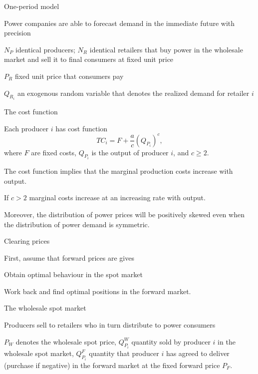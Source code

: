 



	One-period model


	Power companies are able to forecast demand in the immediate future with precision


	$N_P$ identical producers; $N_R$ identical retailers that buy power in the wholesale market and sell it to final consumers at fixed unit price


	$P_R$ fixed unit price that consumers pay


	$Q_{R_i}$ an exogenous random variable that denotes the realized demand for retailer $i$





{The cost function}






	Each producer $i$ has cost function
$$
TC_i=F+\frac{a}{c}(Q_{P_i})^c,
$$
where $F$ are fixed costs, $Q_{P_i}$ is the output of producer $i$, and $c\geq 2$.


	The cost function implies that the marginal production costs increase with output.


	If $c>2$ marginal costs increase at an increasing rate with output.


	Moreover, the distribution of power prices will be positively skewed even when the distribution of power demand is symmetric.





{Clearing prices}






	First, assume that forward prices are gives


	Obtain optimal behaviour in the spot market


	Work back and find optimal positions in the forward market.





{The wholesale spot market}






	Producers sell to retailers who in turn distribute to power consumers


	$P_W$ denotes the wholesale spot price, $Q_{P_i}^W$ quantity sold by producer $i$ in the wholesale spot market, $Q_{P_i}^F$ quantity
that producer $i$ has agreed to deliver (purchase if negative) in the forward market at the fixed forward price $P_F$.


